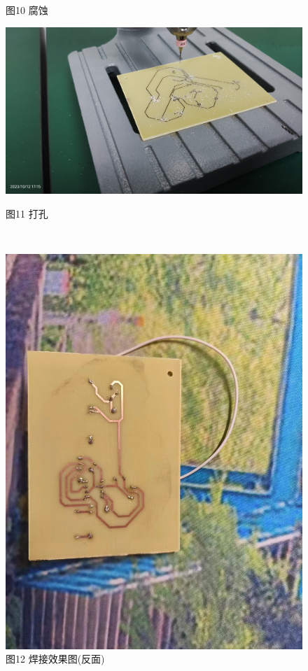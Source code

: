 \documentclass[a4paper,12pt]{article}
\begin{document}
\begin{enumerate}
\begin{figure}[h]
\begin{minipage}{0.35\textwidth}
					\caption*{图10 腐蚀}
				\end{minipage}
				\qquad
				\begin{minipage}{0.35\textwidth}
					\centering
					\includegraphics[width=\textwidth]{4.jpg}
					\caption*{图11 打孔}
				\end{minipage}
				\\
				\begin{minipage}{0.35\textwidth}
					\centering
					\includegraphics[height=\textwidth,angle=90]{7.jpg}
					\caption*{图12 焊接效果图(反面)}
				\end{minipage}
				\qquad
				\begin{minipage}{0.35\textwidth}

\end{minipage}
\end{figure}
\end{enumerate}
\end{document}
